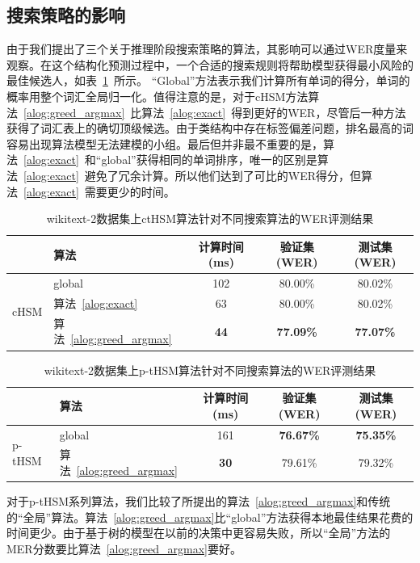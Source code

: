 \subsection{搜索策略的影响}
由于我们提出了三个关于推理阶段搜索策略的算法，其影响可以通过WER度量来观察。在这个结构化预测过程中，一个合适的搜索规则将帮助模型获得最小风险的最佳候选人，如表~\ref{tab:search}~所示。 “Global”方法表示我们计算所有单词的得分，单词的概率用整个词汇全局归一化。值得注意的是，对于cHSM方法算法~\ref{alog:greed_argmax}~比算法~\ref{alog:exact}~得到更好的WER，尽管后一种方法获得了词汇表上的确切顶级候选。由于类结构中存在标签偏差问题，排名最高的词容易出现算法模型无法建模的小组。最后但并非最不重要的是，算法~\ref{alog:exact}~和``global''获得相同的单词排序，唯一的区别是算法~\ref{alog:exact}~避免了冗余计算。所以他们达到了可比的WER得分，但算法~\ref{alog:exact}~需要更少的时间。
\begin{table}[!t]
  \centering
  \caption{wikitext-2数据集上ctHSM算法针对不同搜索算法的WER评测结果\label{tab:search}}
\begin{tabular}{llccc}
  \toprule
   & 算法&计算时间 (ms)&验证集 (WER)& 测试集(WER)\\ \midrule
  \multirow{3}{*}{cHSM} &global&102& 80.00\%& 80.02\%\\
        &算法~\ref{alog:exact}&63& 80.00\%& 80.02\%\\
        &算法~\ref{alog:greed_argmax}&\textbf{44}&\textbf{ 77.09\%}&\textbf{ 77.07\%}\\
  \bottomrule
\end{tabular}
\end{table}

\begin{table}[!t]
  \centering
  \caption{wikitext-2数据集上p-tHSM算法针对不同搜索算法的WER评测结果\label{tab:psearch2}}
\begin{tabular}{llccc}
  \toprule
        & 算法&计算时间 (ms)&验证集 (WER)& 测试集(WER)\\ \midrule
  \multirow{2}{*}{p-tHSM}  &global&161& \textbf{76.67\%}&\textbf{75.35\%}\\
        &算法~\ref{alog:greed_argmax}&\textbf{30} & 79.61\%&79.32\%\\
  \bottomrule
\end{tabular}
\end{table}

对于p-tHSM系列算法，我们比较了所提出的算法~\ref{alog:greed_argmax}和传统的“全局”算法。算法~\ref{alog:greed_argmax}比“global”方法获得本地最佳结果花费的时间更少。由于基于树的模型在以前的决策中更容易失败，所以“全局”方法的MER分数要比算法~\ref{alog:greed_argmax}要好。

